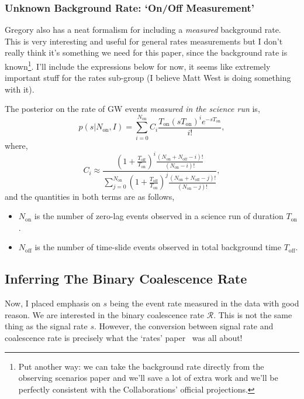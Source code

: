 \documentclass[twocolumn,nofootinbib]{revtex4-1}
\newcommand{\cbcrate}{{{\mathcal R}}}
\begin{document}
 
\subsubsection{Unknown Background Rate: `On/Off Measurement'}
Gregory also has a neat formalism for including a \emph{measured} background
rate.  This is very interesting and useful for general rates measurements but I
don't really think it's something we need for this paper, since the background
rate is known\footnote{Put another way: we can take the background rate directly
from the observing scenarios paper and we'll save a lot of extra work and we'll
be perfectly consistent with the Collaborations' official projections.}.  I'll
include the expressions below for now, it seems like extremely important stuff
for the rates sub-group (I believe Matt West is doing something with it).

The posterior on the rate of GW events \emph{measured in the science run} is,
\begin{equation}\label{eq:signal_rate_posterior}
p(s | N_{\textrm{on}}, I) = \sum_{i=0}^{N_{\textrm{on}}} C_i
\frac{T_{\textrm{on}} (sT_{\textrm{on}})^i e^{-s T_{\textrm{on}} }}{i!},
\end{equation}
where,
\begin{equation}
C_i \approx \frac{ \left(1 + \frac{T_{\textrm{off}}}{T_{\textrm{on}}}\right)^i
\frac{(N_{\textrm{on}} + N_{\textrm{off}} - i )!}{(N_{\textrm{on}}-i)!} }
{\sum_{j=0}^{N_{\textrm{on}}} \left(1 +
\frac{T_{\textrm{off}}}{T_{\textrm{on}}}\right)^j\frac{(N_{\textrm{on}} +
N_{\textrm{off}} - j )!}{(N_{\textrm{on}}-j)!}},
\end{equation}
%
and the quantities in both terms are as follows,
\begin{itemize}
\item $N_{\textrm{on}}$ is the number of zero-lag events observed in a science
run of duration $T_{\textrm{on}}$.
\item $N_{\textrm{off}}$ is the number of time-slide events observed in total
background time $T_{\textrm{off}}$.
\end{itemize}
%
\subsection{Inferring The Binary Coalescence Rate}
Now, I placed emphasis on $s$ being the event rate measured in the data with
good reason.  We are interested in the binary coalescence rate $\cbcrate$.  This
is not the same thing as the signal rate $s$.  However, the conversion between
signal rate and coalescence rate is precisely what the `rates'
paper~\cite{rates_paper} was all about!
\end{document}

